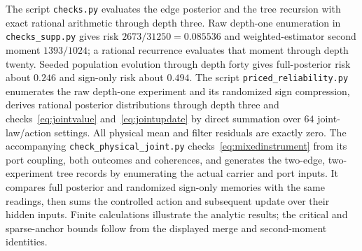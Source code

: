 \documentclass[11pt,a4paper]{article}
\begin{document}
The script \texttt{checks.py} evaluates the edge posterior and the tree recursion with exact rational arithmetic through depth three. Raw depth-one enumeration in \texttt{checks\_supp.py} gives risk $2673/31250=0.085536$ and weighted-estimator second moment $1393/1024$; a rational recurrence evaluates that moment through depth twenty. Seeded population evolution through depth forty gives full-posterior risk about $0.246$ and sign-only risk about $0.494$. The script \texttt{priced\_reliability.py} enumerates the raw depth-one experiment and its randomized sign compression, derives rational posterior distributions through depth three and checks~\eqref{eq:jointvalue} and~\eqref{eq:jointupdate} by direct summation over $64$ joint-law/action settings. All physical mean and filter residuals are exactly zero. The accompanying \texttt{check\_physical\_joint.py} checks~\eqref{eq:mixedinstrument} from its port coupling, both outcomes and coherences, and generates the two-edge, two-experiment tree records by enumerating the actual carrier and port inputs. It compares full posterior and randomized sign-only memories with the same readings, then sums the controlled action and subsequent update over their hidden inputs. Finite calculations illustrate the analytic results; the critical and sparse-anchor bounds follow from the displayed merge and second-moment identities.
\end{document}
